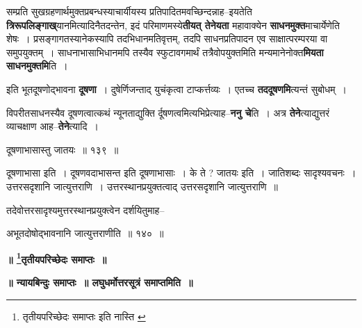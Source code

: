 \documentclass[article,12pt,a4paper]{memoir}
\begin{document}
	  \pstart सम्प्रति सुखग्रहणार्थमुक्तप्रबन्धस्याचार्यीयस्य प्रतिपादितमवच्छिन्दन्नाह--इयतेति \textbf{त्रिरूपलिङ्गाख्}यानमित्यादिनैतदन्तेन, इदं परिमाणमस्ये\textbf{तीयत् तेनेयता} महावाक्येन \textbf{साधनमुक्त}माचार्येणेति शेषः । प्रसङ्गागतस्यानेकस्यापि तदभिधानमतिवृत्तम्, तदपि साधनप्रतिपादन एव साक्षात्परम्परया वा समुपयुक्तम् । साधनाभासाभिधानमपि तस्यैव स्फुटावगमार्थं तत्रैवोपयुक्तमिति मन्यमानेनोक्त\textbf{मियता साधनमुक्तमि}ति ।
	\pend
      

	  \pstart इति भूतदूषणोद्भावना \textbf{दूषणा} । दुषेर्णिजन्ताद् युचंकृत्वा टाप्कर्त्तव्यः । एतच्च \textbf{तददूषणमि}त्यन्तं सुबोधम् ।
	\pend
      

	  \pstart विपरीतसाधनस्यैव दूषणत्वात्कथं न्यूनताद्युक्ति  र्दूषणत्वमित्यभिप्रेत्याह--\textbf{ननु चे}ति । अत्र \textbf{तेने}त्याद्युत्तरं व्याचक्षाण आह--\textbf{तेने}त्यादि ।
	\pend
	  \bigskip
	  \begingroup
	
	  \bigskip
	  \begingroup
	

	  \pstart दूषणाभासास्तु जातयः ॥ १३९ ॥
	\pend
      
	  \endgroup
	 

	  \pstart दूषणाभासा इति । दूषणवदाभासन्त इति दूषणाभासाः । के ते ? जातयः इति । जातिशब्दः सादृश्यवचनः । उत्तरसदृशानि जात्युत्तराणि । उत्तरस्थानप्रयुक्तत्वाद् उत्तरसदृशानि जात्युत्तराणि ॥
	\pend
        

	  \pstart तदेवोत्तरसादृश्यमुत्तरस्थानप्रयुक्त्वेन दर्शयितुमाह--
	\pend
        
	  \bigskip
	  \begingroup
	

	  \pstart {}अभूतदोषोद्भावनानि जात्युत्तराणीति ॥ १४० ॥
	\pend
      
	  \endgroup
	 

	  \begin{center}%
	\textbf{॥ \footnote{तृतीयपरिच्छेदः समाप्तः इति नास्ति \cite{dp-msC} \cite{dp-msD}}\-तृतीयपरिच्छेदः समाप्तः ॥}
	\end{center}
	 

	  \begin{center}%
	\textbf{॥ न्यायबिन्दुः समाप्तः ॥ लघुधर्मोत्तरसूत्रं समाप्तमिति ॥}
	\end{center}
	
\end{document}
